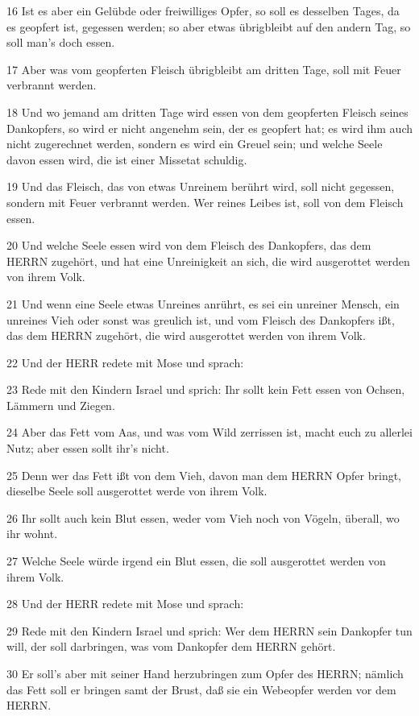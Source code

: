 \par 16 Ist es aber ein Gelübde oder freiwilliges Opfer, so soll es desselben Tages, da es geopfert ist, gegessen werden; so aber etwas übrigbleibt auf den andern Tag, so soll man's doch essen.
\par 17 Aber was vom geopferten Fleisch übrigbleibt am dritten Tage, soll mit Feuer verbrannt werden.
\par 18 Und wo jemand am dritten Tage wird essen von dem geopferten Fleisch seines Dankopfers, so wird er nicht angenehm sein, der es geopfert hat; es wird ihm auch nicht zugerechnet werden, sondern es wird ein Greuel sein; und welche Seele davon essen wird, die ist einer Missetat schuldig.
\par 19 Und das Fleisch, das von etwas Unreinem berührt wird, soll nicht gegessen, sondern mit Feuer verbrannt werden. Wer reines Leibes ist, soll von dem Fleisch essen.
\par 20 Und welche Seele essen wird von dem Fleisch des Dankopfers, das dem HERRN zugehört, und hat eine Unreinigkeit an sich, die wird ausgerottet werden von ihrem Volk.
\par 21 Und wenn eine Seele etwas Unreines anrührt, es sei ein unreiner Mensch, ein unreines Vieh oder sonst was greulich ist, und vom Fleisch des Dankopfers ißt, das dem HERRN zugehört, die wird ausgerottet werden von ihrem Volk.
\par 22 Und der HERR redete mit Mose und sprach:
\par 23 Rede mit den Kindern Israel und sprich: Ihr sollt kein Fett essen von Ochsen, Lämmern und Ziegen.
\par 24 Aber das Fett vom Aas, und was vom Wild zerrissen ist, macht euch zu allerlei Nutz; aber essen sollt ihr's nicht.
\par 25 Denn wer das Fett ißt von dem Vieh, davon man dem HERRN Opfer bringt, dieselbe Seele soll ausgerottet werde von ihrem Volk.
\par 26 Ihr sollt auch kein Blut essen, weder vom Vieh noch von Vögeln, überall, wo ihr wohnt.
\par 27 Welche Seele würde irgend ein Blut essen, die soll ausgerottet werden von ihrem Volk.
\par 28 Und der HERR redete mit Mose und sprach:
\par 29 Rede mit den Kindern Israel und sprich: Wer dem HERRN sein Dankopfer tun will, der soll darbringen, was vom Dankopfer dem HERRN gehört.
\par 30 Er soll's aber mit seiner Hand herzubringen zum Opfer des HERRN; nämlich das Fett soll er bringen samt der Brust, daß sie ein Webeopfer werden vor dem HERRN.
